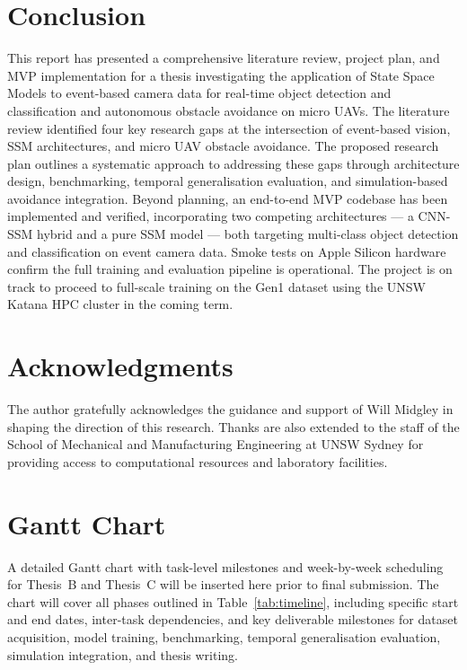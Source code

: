 \documentclass[11pt, a4paper]{report}
\begin{document}
\chapter{Conclusion}
This report has presented a comprehensive literature review, project plan, and MVP implementation for a thesis investigating the application of State Space Models to event-based camera data for real-time object detection and classification and autonomous obstacle avoidance on micro UAVs. The literature review identified four key research gaps at the intersection of event-based vision, SSM architectures, and micro UAV obstacle avoidance. The proposed research plan outlines a systematic approach to addressing these gaps through architecture design, benchmarking, temporal generalisation evaluation, and simulation-based avoidance integration. Beyond planning, an end-to-end MVP codebase has been implemented and verified, incorporating two competing architectures — a CNN-SSM hybrid and a pure SSM model — both targeting multi-class object detection and classification on event camera data. Smoke tests on Apple Silicon hardware confirm the full training and evaluation pipeline is operational. The project is on track to proceed to full-scale training on the Gen1 dataset using the UNSW Katana HPC cluster in the coming term. 

\chapter{Acknowledgments}
The author gratefully acknowledges the guidance and support of Will Midgley in shaping the direction of this research. Thanks are also extended to the staff of the School of Mechanical and Manufacturing Engineering at UNSW Sydney for providing access to computational resources and laboratory facilities. 

\appendix

\chapter{Gantt Chart}
\label{app:gantt}

\noindent A detailed Gantt chart with task-level milestones and week-by-week scheduling for Thesis~B and Thesis~C will be inserted here prior to final submission. The chart will cover all phases outlined in Table~\ref{tab:timeline}, including specific start and end dates, inter-task dependencies, and key deliverable milestones for dataset acquisition, model training, benchmarking, temporal generalisation evaluation, simulation integration, and thesis writing.
\end{document}
